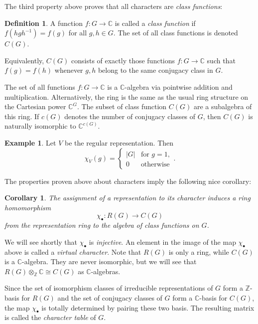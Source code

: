 \documentclass[12pt]{article}
\theoremstyle{plain}
\newtheorem{corollary}[theorem]{Corollary}
\theoremstyle{definition}
\newtheorem{definition}[theorem]{Definition}
\newtheorem{example}[theorem]{Example}
\theoremstyle{remark}
\numberwithin{equation}{section}
\begin{document}
The third property above proves that all characters are \emph{class
functions}:

\begin{definition}
A function $f : G \to \mathbb{C}$ is called a \emph{class function}
if $f(hgh^{-1})=f(g)$ for all $g,h \in G$.
The set of all class functions is denoted $C(G)$.
\end{definition}

Equivalently, $C(G)$ consists of exactly those functions $f : G \to
\mathbb{C}$ such that $f(g)=f(h)$ whenever $g, h$ belong to the
same conjugacy class in $G$.

The set of all functions $f : G \to \mathbb{C}$ is a
$\mathbb{C}$-algebra via pointwise addition and multiplication.
Alternatively, the ring is the same as the usual ring structure on the
Cartesian power $\mathbb{C}^G$.
The subset of class function $C(G)$ are a subalgebra of this ring.
If $c(G)$ denotes the number of conjugacy classes of $G$,
then $C(G)$ is naturally isomorphic to $\mathbb{C}^{c(G)}$.

\begin{example} \label{eg:regular_rep}
Let $V$ be the regular representation.  Then
\[
\chi_V(g) = \begin{cases}
|G| & \textrm{for $g=1$},\\
0 & \textrm{otherwise}
\end{cases} .
\]
\end{example}

The properties proven above about characters imply the following nice
corollary:

\begin{corollary}
The assignment of a representation to its character
induces a ring homomorphism
\[
\chi_{\bullet}: R(G) \to C(G)
\]
from the representation ring to the algebra of class functions on $G$.
\end{corollary}

We will see shortly that $\chi_{\bullet}$ is \emph{injective}.
An element in the image of the map $\chi_{\bullet}$ above is called a \emph{virtual
character}.  Note that $R(G)$ is only a ring, while $C(G)$ is a
$\mathbb{C}$-algebra.  They are never isomorphic, but we will see that
$R(G) \otimes_\mathbb{Z} \mathbb{C} \cong C(G)$ as $\mathbb{C}$-algebras.

Since the set of isomorphism classes of irreducible representations of
$G$ form a $\mathbb{Z}$-basis for $R(G)$
and the set of conjugacy classes of $G$
form a $\mathbb{C}$-basis for $C(G)$,
the map $\chi_{\bullet}$ is totally determined by pairing these two basis.
The resulting matrix is called the \emph{character table} of $G$.
\end{document}
